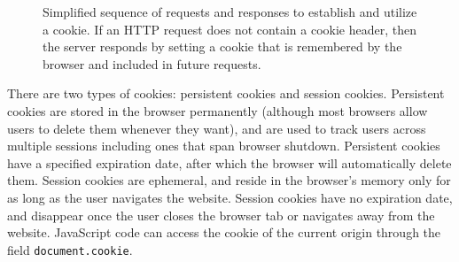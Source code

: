 \documentclass[11pt,twoside]{scrartcl}
\begin{document}
\begin{figure}
\centering
{}

\caption{\label{fig:cookiediagram} Simplified sequence of requests and responses to establish and utilize a cookie. If an HTTP request does not contain a cookie header, then the server responds by setting a cookie that is remembered by the browser and included in future requests.}
\end{figure}

There are two types of cookies: persistent cookies and session cookies. Persistent cookies are stored in the browser permanently (although most browsers allow users to delete them whenever they want), and are used to track users across multiple sessions including ones that span browser shutdown. Persistent cookies have a specified expiration date, after which the browser will automatically delete them. Session cookies are ephemeral, and reside in the browser's memory only for as long as the user navigates the website. Session cookies have no expiration date, and disappear once the user closes the browser tab or navigates away from the website. JavaScript code can access the cookie of the current origin through the field \verb'document.cookie'.
\end{document}
